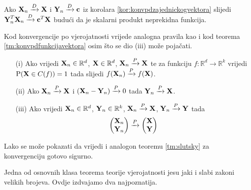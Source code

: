 \begin{primjer_}
	Ako $\konvpd{\tsvek{X}_n}{\tsvek{X}}$ i 
	$\konvpd{\tsvek{Y}_n}{\tv{c}}$ iz korolara
	\ref{kor:konvpdzajednickogvektora}
	slijedi $\konvpd{\tsvek{Y}_{n}^{T} \tsvek{X}_n}{\tv{c}^{T} \tsvek{X}}$ budući da je
	skalarni produkt neprekidna funkcija.
\end{primjer_}

Kod konvergencije po vjerojatnosti vrijede analogna pravila kao
i kod teorema \ref{tm:konvpdfunkcijavektora} osim
što se dio (iii) može pojačati.

\begin{tm}
\label{tm:slutsky}
	{} \nopagebreak
	\begin{itemize}
		\item[(i)]{Ako vrijedi $\tsvek{X}_n \in \mathbb{R}^d$,
 			$\tsvek{X} \in \mathbb{R}^d$,
			$\konvpv{\tsvek{X}_n}{\tsvek{X}}$
			te za funkciju $f:\mathbb{R}^d \rightarrow \mathbb{R}^k$
			vrijedi 
			$\vP(\tsvek{X} \in C(f)) = 1$ 
			tada slijedi $\konvpv{f(\tsvek{X}_n)}{f(\tsvek{X})}$.}
		\item[(ii)]{Ako $\konvpv{\tsvek{X}_n}{\tsvek{X}}$
			i $\konvpv{(\tsvek{X}_n-\tsvek{Y}_n)}{0}$ 
			tada $\konvpv{\tsvek{Y}_n}{\tsvek{X}}$.}
		\item[(iii)]{Ako vrijedi $\tsvek{X}_n \in \mathbb{R}^d$,
			$\tsvek{Y}_n \in \mathbb{R}^k$,
			$\konvpv{\tsvek{X}_n}{\tsvek{X}}$,
			$\konvpv{\tsvek{Y}_n}{\tsvek{Y}}$ tada
			\begin{equation}
				\konvpv{
					\begin{pmatrix}
						\tsvek{X}_n \\
						\tsvek{Y}_n \\
					\end{pmatrix}
				}{
					\begin{pmatrix}
						\tsvek{X} \\
						\tsvek{Y} \\
					\end{pmatrix}
				}
			\end{equation}
		}
	\end{itemize}
\end{tm}

Lako se može pokazati da vrijedi i
analogon teoremu \ref{tm:slutsky} za konvergenciju gotovo
sigurno.

Jedna od osnovnih klasa teorema teorije vjerojatnosti
jesu jaki i slabi zakoni velikih brojeva. Ovdje
izdvajamo dva najpoznatija.

